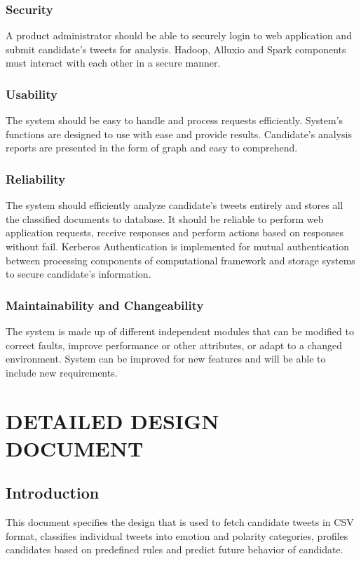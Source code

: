 \documentclass[oneside,a4paper,12pt]{pictreport}
\begin{document}
\subsection{Security}
A product administrator should be able to securely login to web application and submit candidate's tweets for analysis. Hadoop, Alluxio and Spark components must interact with each other in a secure manner.

\subsection{Usability}
The system should be easy to handle and process requests efficiently. System's functions are designed to use with ease and provide results. Candidate's analysis reports are presented in the form of graph and easy to comprehend.

\subsection{Reliability}
The system should efficiently analyze candidate's tweets entirely and stores all the classified documents to database. It should be reliable to perform web application requests, receive responses and perform actions based on responses without fail. Kerberos Authentication is implemented for mutual authentication between processing components of computational framework and storage systems to secure candidate's information. 

\subsection{Maintainability and Changeability}
The system is made up of different independent modules that can be modified to correct faults, improve performance or other attributes, or adapt to a changed environment. System can be improved for new features and will be able to include new requirements.

\chapter{DETAILED DESIGN DOCUMENT}

\section{Introduction}
This document specifies the design that is used to fetch candidate tweets in CSV format, classifies individual tweets into emotion and polarity categories, profiles candidates based on predefined rules and predict future behavior of candidate.
\end{document}
